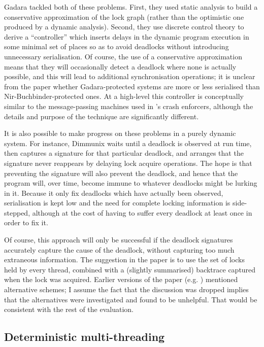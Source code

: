 Gadara\cite{Wang2008} tackled both of these problems.  First, they
used static analysis to build a conservative approximation of the lock
graph (rather than the optimistic one produced by a dynamic analysis).
Second, they use discrete control theory to derive a ``controller''
which inserts delays in the dynamic program execution in some minimal
set of places so as to avoid deadlocks without introducing unnecessary
serialisation.  Of course, the use of a conservative approximation
means that they will occasionally detect a deadlock where none is
actually possible, and this will lead to additional synchronisation
operations; it is unclear from the paper whether Gadara-protected
systems are more or less serialised than Nir-Buchbinder-protected
ones.  At a high-level this controller is conceptually similar to the
message-passing machines used in {\technique}'s crash enforcers,
although the details and purpose of the technique are significantly
different.

It is also possible to make progress on these problems in a purely
dynamic system.  For instance, Dimmunix\cite{Jula2008} waits until a
deadlock is observed at run time, then captures a signature for that
particular deadlock, and arranges that the signature never reappears
by delaying lock acquire operations.  The hope is that preventing the
signature will also prevent the deadlock, and hence that the program
will, over time, become immune to whatever deadlocks might be lurking
in it.  Because it only fix deadlocks which have actually been
observed, serialisation is kept low and the need for complete locking
information is side-stepped, although at the cost of having to suffer
every deadlock at least once in order to fix it.

Of course, this approach will only be successful if the deadlock
signatures accurately capture the cause of the deadlock, without
capturing too much extraneous information.  The suggestion in the
paper is to use the set of locks held by every thread, combined with a
(slightly summarised) backtrace captured when the lock was acquired.
Earlier versions of the paper (e.g. \cite{Jula2008b}) mentioned
alternative schemes; I assume the fact that the discussion was dropped
implies that the alternatives were investigated and found to be
unhelpful.  That would be consistent with the rest of the
evaluation.

\subsection{Deterministic multi-threading}

